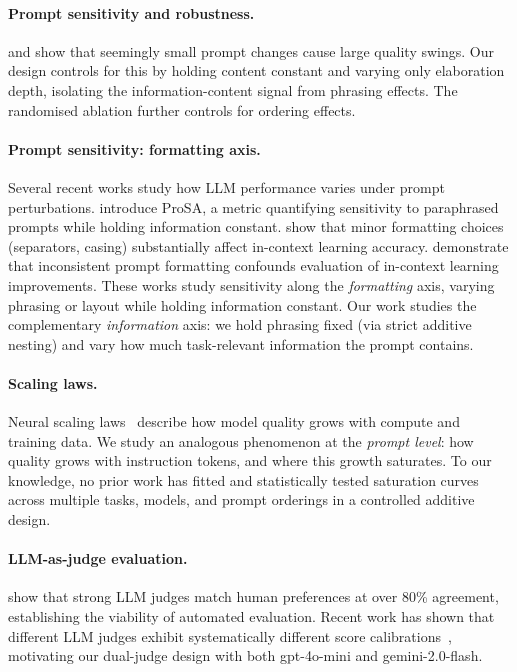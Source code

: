 \paragraph{Prompt sensitivity and robustness.}
\citet{webson2022prompt} and \citet{mizrahi2024state} show that seemingly
small prompt changes cause large quality swings.
Our design controls for this by holding content constant and varying only
elaboration depth, isolating the information-content signal from phrasing
effects.
The randomised ablation further controls for ordering effects.

\paragraph{Prompt sensitivity: formatting axis.}
Several recent works study how LLM performance varies under prompt
perturbations.
\citet{zhuo2024prosa} introduce ProSA, a metric quantifying sensitivity
to paraphrased prompts while holding information constant.
\citet{sclar2024quantifying} show that minor formatting choices
(separators, casing) substantially affect in-context learning accuracy.
\citet{voronov2024mind} demonstrate that inconsistent prompt formatting
confounds evaluation of in-context learning improvements.
These works study sensitivity along the \emph{formatting} axis, varying
phrasing or layout while holding information constant.
Our work studies the complementary \emph{information} axis: we hold
phrasing fixed (via strict additive nesting) and vary how much
task-relevant information the prompt contains.

\paragraph{Scaling laws.}
Neural scaling laws~\citep{kaplan2020scaling,hoffmann2022chinchilla} describe
how model quality grows with compute and training data.
We study an analogous phenomenon at the \emph{prompt level}: how quality
grows with instruction tokens, and where this growth saturates.
To our knowledge, no prior work has fitted and statistically tested saturation
curves across multiple tasks, models, and prompt orderings in a controlled
additive design.

\paragraph{LLM-as-judge evaluation.}
\citet{zheng2023judging} show that strong LLM judges match human preferences
at over 80\% agreement, establishing the viability of automated evaluation.
Recent work has shown that different LLM judges exhibit systematically
different score calibrations~\citep{chen2025scoring,li2026same}, motivating
our dual-judge design with both gpt-4o-mini and gemini-2.0-flash.
